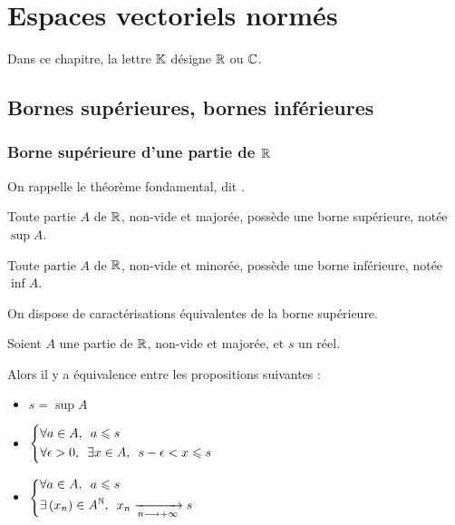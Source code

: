 \chapter{Espaces vectoriels normés}

\minitoc

Dans ce chapitre, la lettre \(\mathbb{K}\) désigne \(\mathbb{R}\) ou \(\mathbb{C}\).

\section{Bornes supérieures, bornes inférieures}

\subsection{Borne supérieure d'une partie de \(\mathbb{R}\)}

On rappelle le théorème fondamental, dit .

\begin{theo}
Toute partie \(A\) de \(\mathbb{R}\), non-vide et majorée, possède une borne supérieure, notée \(\sup A\).

Toute partie \(A\) de \(\mathbb{R}\), non-vide et minorée, possède une borne inférieure, notée \(\inf A\).
\end{theo}

On dispose de caractérisations équivalentes de la borne supérieure.

\begin{prop}
Soient \(A\) une partie de \(\mathbb{R}\), non-vide et majorée, et \(s\) un réel.

Alors il y a équivalence entre les propositions suivantes :

\begin{itemize}
    \item \(s=\sup A\) \\
    \item \(\begin{dcases}\quantifs{\forall a\in A}a\leq s \\ \quantifs{\forall\epsilon>0;\exists x\in A}s-\epsilon<x\leq s\end{dcases}\) \\
    \item \(\begin{dcases}\quantifs{\forall a\in A}a\leq s \\ \quantifs{\exists\paren{x_n}\in A^\N}x_n\tendqd{n\to\pinf}s\end{dcases}\)
\end{itemize}
\end{prop}

